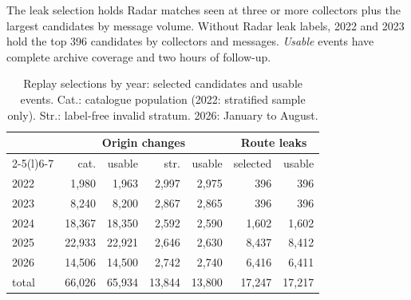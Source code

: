 The leak selection holds Radar matches seen at three or more collectors plus the largest candidates by message volume.
Without Radar leak labels, 2022 and 2023 hold the top 396 candidates by collectors and messages.
\emph{Usable} events have complete archive coverage and two hours of follow-up.

\begin{table}[t]
\footnotesize
\centering
\caption{Replay selections by year: selected candidates and usable events. Cat.: catalogue population (2022: stratified sample only). Str.: label-free invalid stratum. 2026: January to August.}
\label{tab:selection}
\setlength{\tabcolsep}{3pt}
\begin{tabular}{@{}lrrrrrr@{}}
\toprule
 & \multicolumn{4}{c}{Origin changes} & \multicolumn{2}{c}{Route leaks} \\
\cmidrule(lr){2-5}\cmidrule(l){6-7}
 & cat. & usable & str. & usable & selected & usable \\
\midrule
2022 & 1,980 & 1,963 & 2,997 & 2,975 & 396 & 396 \\
2023 & 8,240 & 8,200 & 2,867 & 2,865 & 396 & 396 \\
2024 & 18,367 & 18,350 & 2,592 & 2,590 & 1,602 & 1,602 \\
2025 & 22,933 & 22,921 & 2,646 & 2,630 & 8,437 & 8,412 \\
2026 & 14,506 & 14,500 & 2,742 & 2,740 & 6,416 & 6,411 \\
\midrule
total & 66,026 & 65,934 & 13,844 & 13,800 & 17,247 & 17,217 \\
\bottomrule
\end{tabular}
\end{table}

